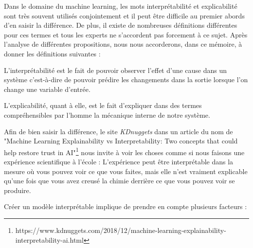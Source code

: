 Dans le domaine du machine learning, les mots interprétabilité et explicabilité sont très souvent utilisés conjointement et il peut être difficile au premier abords d'en saisir la différence. De plus, il existe de nombreuses définitions différentes pour ces termes et tous les experts ne s'accordent pas forcement à ce sujet. Après l'analyse de différentes propositions, nous nous accorderons, dans ce mémoire, à donner les définitions suivantes :\par
L'interprétabilité est le fait de pouvoir observer l'effet d'une cause dans un système c'est-à-dire de pouvoir prédire les changements dans la sortie lorsque l'on change une variable d'entrée.\par
L'explicabilité, quant à elle, est le fait d'expliquer dans des termes compréhensibles par l'homme la mécanique interne de notre système.\par
Afin de bien saisir la différence, le site \textit{KDnuggets} dans un article du nom de "Machine Learning Explainability vs Interpretability: Two concepts that could help restore trust in AI"\footnote{https://www.kdnuggets.com/2018/12/machine-learning-explainability-interpretability-ai.html} nous invite à voir les choses comme si nous faisons une expérience scientifique à l'école : L'expérience peut être interprétable dans la mesure où vous pouvez voir ce que vous faites, mais elle n'est vraiment explicable qu'une fois que vous avez creusé la chimie derrière ce que vous pouvez voir se produire.\par
Créer un modèle interprétable implique de prendre en compte plusieurs facteurs :\par
